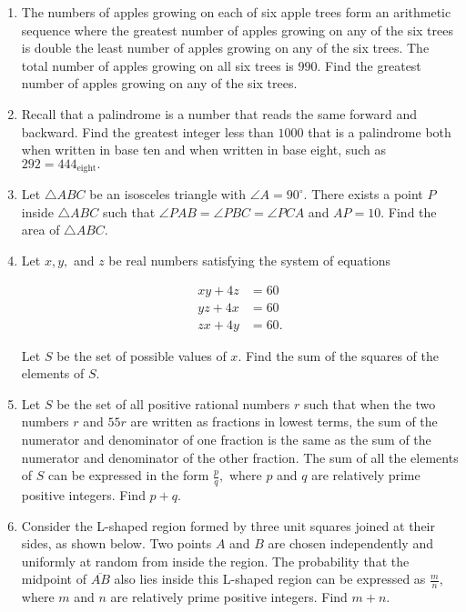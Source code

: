 \documentclass{article}
\begin{document}
\begin{enumerate}[label=\arabic*., itemsep=0.5em]
\item The numbers of apples growing on each of six apple trees form an arithmetic sequence where the greatest number of apples growing on any of the six trees is double the least number of apples growing on any of the six trees. The total number of apples growing on all six trees is \(990.\) Find the greatest number of apples growing on any of the six trees.\par \vspace{0.5em}\item Recall that a palindrome is a number that reads the same forward and backward. Find the greatest integer less than \(1000\) that is a palindrome both when written in base ten and when written in base eight, such as \(292 = 444_{\text{eight}}.\)\par \vspace{0.5em}\item Let \(\triangle ABC\) be an isosceles triangle with \(\angle A = 90^\circ.\) There exists a point \(P\) inside \(\triangle ABC\) such that \(\angle PAB = \angle PBC = \angle PCA\) and \(AP = 10.\) Find the area of \(\triangle ABC.\)\par \vspace{0.5em}\item Let \(x,y,\) and \(z\) be real numbers satisfying the system of equations

\begin{align*}
xy + 4z &= 60 \\
yz + 4x &= 60 \\
zx + 4y &= 60.
\end{align*}

Let \(S\) be the set of possible values of \(x.\) Find the sum of the squares of the elements of \(S.\)\par \vspace{0.5em}\item Let \(S\) be the set of all positive rational numbers \(r\) such that when the two numbers \(r\) and \(55r\) are written as fractions in lowest terms, the sum of the numerator and denominator of one fraction is the same as the sum of the numerator and denominator of the other fraction. The sum of all the elements of \(S\) can be expressed in the form \(\frac{p}{q},\) where \(p\) and \(q\) are relatively prime positive integers. Find \(p+q.\)\par \vspace{0.5em}\item Consider the L-shaped region formed by three unit squares joined at their sides, as shown below. Two points \(A\) and \(B\) are chosen independently and uniformly at random from inside the region. The probability that the midpoint of \(\overline{AB}\) also lies inside this L-shaped region can be expressed as \(\frac{m}{n},\) where \(m\) and \(n\) are relatively prime positive integers. Find \(m+n.\)


\end{enumerate}
\end{document}
